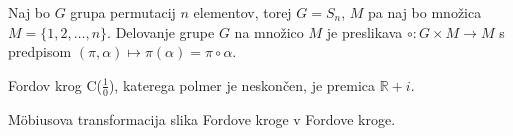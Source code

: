 \documentclass[mat1]{fmfdelo}
\begin{document}
\begin{primer}
Naj bo $G$ grupa permutacij $n$ elementov, torej $G = S_{n}$, $M$ pa naj bo množica $M = \{1,2, \ldots, n \}$.
Delovanje grupe $G$ na množico $M$ je preslikava \( \circ \colon G \times M \rightarrow M \) s predpisom \( (\pi, \alpha) \mapsto \pi(\alpha) = \pi \circ \alpha \).
\end{primer}

\begin{definicija}
Fordov krog C($\frac{1}{0}$), katerega polmer je neskončen, je premica $\mathbb{R} + i$.
\end{definicija}

\begin{izrek}
\label{izr:MobDelovanje}
M\"{o}biusova transformacija slika Fordove kroge v Fordove kroge.
\end{izrek}
\end{document}
